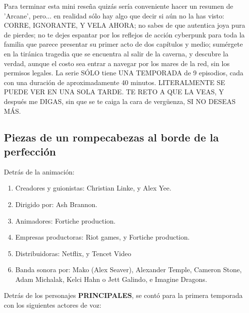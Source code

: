 \documentclass[11pt,A5]{article}
\begin{document}
Para terminar esta mini reseña quizás sería conveniente hacer un resumen de 'Arcane', pero... en realidad sólo hay algo que decir si aún no la has visto: CORRE, IGNORANTE, Y VELA AHORA; no sabes de que autentica joya pura de pierdes; no te dejes espantar por los reflejos de acción cyberpunk para toda la familia que parece presentar su primer acto de dos capítulos y medio; sumérgete en la tiránica tragedia que se encuentra al salir de la caverna, y descubre la verdad, aunque el costo sea entrar a navegar por los mares de la red, sin los permisos legales. La serie SÓLO tiene UNA TEMPORADA de 9 episodios, cada con una duración de aproximadamente 40 minutos. LITERALMENTE SE PUEDE VER EN UNA SOLA TARDE. TE RETO A QUE LA VEAS, Y después me DIGAS, sin que se te caiga la cara de vergüenza, SI NO DESEAS MÁS.

    \subsection*{{\large{\textsf{\hspace{1cm}Piezas de un rompecabezas al borde de la perfección}}}}

Detrás de la animación:

\begin{enumerate}
    \item Creadores y guionistas: Christian Linke, y Alex Yee.
    \item Dirigido por: Ash Brannon.
    \item Animadores: Fortiche production.
    \item Empresas productoras: Riot games, y Fortiche production.
    \item Distribuidoras: Netflix, y Tencet Video
    \item Banda sonora por: Mako (Alex Seaver), Alexander Temple, Cameron Stone, Adam Michalak, Kelci Hahn o Jett Galindo, e Imagine Dragons.
\end{enumerate}

Detrás de los personajes {\textbf{PRINCIPALES}}, se contó para la primera temporada con los siguientes actores de voz:
\end{document}
